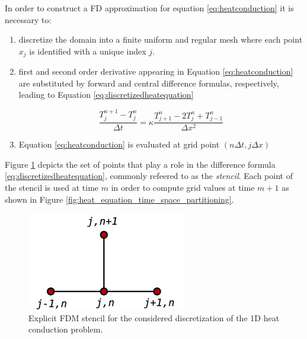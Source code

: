  In order to construct a FD approximation for equation \ref{eq:heatconduction} it is necessary to:  
 \begin{enumerate}
  
  \item discretize the domain into a finite uniform and regular mesh where each point $x_j$ is identified with a unique index $j$.
   
 \item  first and second order derivative appearing in Equation \ref{eq:heatconduction} are substituted by forward and central difference formulas, respectively, leading to Equation \ref{eq:discretizedheatequation} 
 
 \begin{equation}
  \frac{T^{n+1}_{j} - T^n_{j}}{\Delta t} = \kappa \frac{T^n_{j+1}- 2T^n_{j} + T^n_{j-1}}{\Delta x^2}
 \label{eq:discretizedheatequation}
 \end{equation}
 
 \item Equation \ref{eq:heatconduction} is evaluated at grid point $(n\Delta t, j \Delta x)$ 
    
\end{enumerate}    
Figure  \ref{fig:fdmheatequationstencil} depicts the set of points that play a role in the difference formula \ref{eq:discretizedheatequation}, commonly refeered to as the \textit{stencil}. Each point of the stencil is used at time $m$ in order to compute grid values at time $m+1$ as shown in Figure \ref{fig:heat_equation_time_space_partitioning}.
\begin{figure}[b]
  	\centering
  	\includegraphics[scale=0.5]{./images/CA_FDM/heatstencil}
  	\caption{Explicit FDM stencil for the considered discretization of the 1D heat conduction problem.}\label{torus}
   	\label{fig:fdmheatequationstencil}
\end{figure}   
